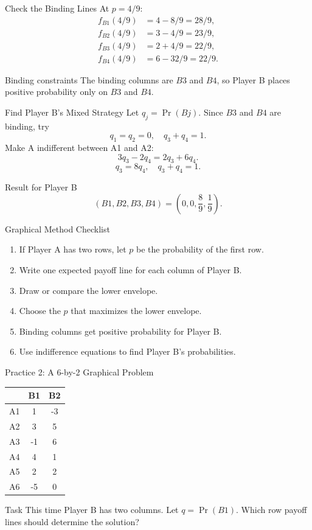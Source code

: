 \documentclass[10pt,aspectratio=169]{beamer}
\begin{document}
\begin{frame}{Check the Binding Lines}
At $p=4/9$:
\begin{align*}
f_{B1}(4/9)&=4-8/9=28/9,\\
f_{B2}(4/9)&=3-4/9=23/9,\\
f_{B3}(4/9)&=2+4/9=22/9,\\
f_{B4}(4/9)&=6-32/9=22/9.
\end{align*}
\vspace{0.2cm}
\begin{block}{Binding constraints}
The binding columns are $B3$ and $B4$, so Player B places positive probability only on $B3$ and $B4$.
\end{block}
\end{frame}

\begin{frame}{Find Player B's Mixed Strategy}
Let $q_j=\Pr(Bj)$. Since $B3$ and $B4$ are binding, try
\[
q_1=q_2=0,\quad q_3+q_4=1.
\]
Make A indifferent between A1 and A2:
\[
3q_3-2q_4 = 2q_3+6q_4.
\]
\[
q_3=8q_4,\quad q_3+q_4=1.
\]
\begin{block}{Result for Player B}
\[
(B1,B2,B3,B4)=\left(0,0,\frac{8}{9},\frac{1}{9}\right).
\]
\end{block}
\end{frame}

\begin{frame}{Graphical Method Checklist}
\begin{enumerate}
  \item If Player A has two rows, let $p$ be the probability of the first row.
  \item Write one expected payoff line for each column of Player B.
  \item Draw or compare the lower envelope.
  \item Choose the $p$ that maximizes the lower envelope.
  \item Binding columns get positive probability for Player B.
  \item Use indifference equations to find Player B's probabilities.
\end{enumerate}
\end{frame}

\begin{frame}{Practice 2: A 6-by-2 Graphical Problem}
\begin{center}
\begin{tabular}{c c c}
 & B1 & B2\\
\midrule
A1 & 1 & -3\\
A2 & 3 & 5\\
A3 & -1 & 6\\
A4 & 4 & 1\\
A5 & 2 & 2\\
A6 & -5 & 0\\
\end{tabular}
\end{center}
\vspace{0.2cm}
\begin{block}{Task}
This time Player B has two columns. Let $q=\Pr(B1)$. Which row payoff lines should determine the solution?
\end{block}
\end{frame}
\end{document}
